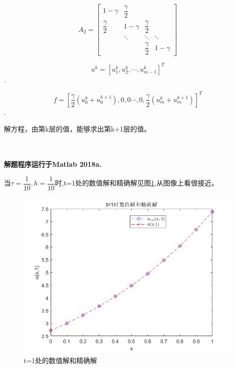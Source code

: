 \documentclass[withoutpreface,bwprint]{cumcmthesis} %
\begin{document}
$$
A_2=
\begin{bmatrix}
1-\gamma & \dfrac{\gamma}{2} \\
\dfrac{\gamma}{2} & 1-\gamma & \dfrac{\gamma}{2} \\
& \ddots & \ddots & \ddots \\
& & 	\dfrac{\gamma}{2} & 1-\gamma
\end{bmatrix}
$$

$$u^k=[u_1^k,u_2^k,\cdots,u_{m-1}^k]^T$$.

$$f=[\dfrac{\gamma}{2}(u_0^k+u_0^{k+1}),0,0\cdots,0,\dfrac{\gamma}{2}(u_m^k+u_m^{k+1})]^T$$.


解方程，由第k层的值，能够求出第k+1层的值。

~\\
~\\


\textbf{解题程序运行于Matlab 2018a.}

当$\tau=\dfrac{1}{10},h=\dfrac{1}{10}$时,t=1处的数值解和精确解见图\ref{fig:f1},从图像上看很接近。
\begin{figure}
	\centering
	\includegraphics[width=0.7\linewidth]{figures/f1}
	\caption{t=1处的数值解和精确解}
	\label{fig:f1}
\end{figure}
\end{document}
